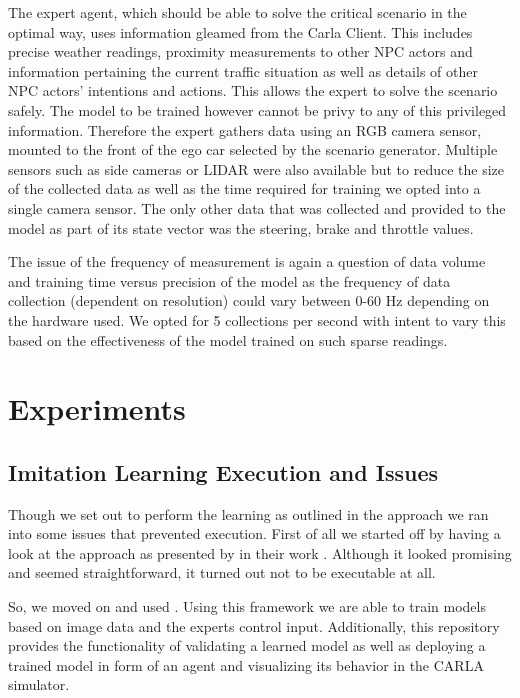 \documentclass[conference, a4paper, 11pt]{IEEEtran}
\begin{document}
The expert agent, which should be able to solve the critical scenario in the optimal way, uses information gleamed from the Carla Client. This includes precise weather readings, proximity measurements to other NPC actors and information pertaining the current traffic situation as well as details of other NPC actors' intentions and actions. This allows the expert to solve the scenario safely. The model to be trained however cannot be privy to any of this privileged information. Therefore the expert gathers data using an RGB camera sensor, mounted to the front of the ego car selected by the scenario generator. Multiple sensors such as side cameras or LIDAR were also available but to reduce the size of the collected data as well as the time required for training we opted into a single camera sensor. The only other data that was collected and provided to the model as part of its state vector was the steering, brake and throttle values.

The issue of the frequency of measurement is again a question of data volume and training time versus precision of the model as the frequency of data collection (dependent on resolution) could vary between 0-60 Hz depending on the hardware used. We opted for 5 collections per second with intent to vary this based on the effectiveness of the model trained on such sparse readings.

\section{Experiments}
\subsection{Imitation Learning Execution and Issues}
Though we set out to perform the learning as outlined in the approach we ran into some issues that prevented execution. 
First of all we started off by having a look at the approach as presented by \citeauthor{Xiao2020ActionBasedRL} in their work  \cite{Xiao2020ActionBasedRL, ActionBasedRL:github}. Although it looked promising and seemed straightforward, it turned out not to be executable at all.

So, we moved on and used  \cite{Toromanoff_2020_CVPR}. Using this framework we are able to train models based on image data and the experts control input. Additionally, this repository provides the functionality of validating a learned model as well as deploying a trained model in form of an agent and visualizing its behavior in the CARLA simulator.
\end{document}
